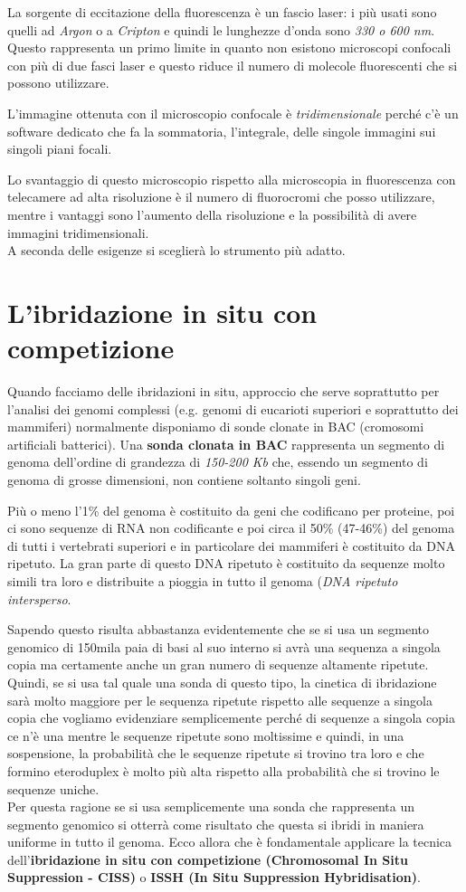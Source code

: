 \documentclass[11pt]{book}
\begin{document}
La sorgente di eccitazione della fluorescenza è un fascio laser: i più usati sono quelli ad \emph{Argon} o a \emph{Cripton} e quindi le lunghezze d’onda sono \emph{330 o 600 nm}. Questo rappresenta un primo limite in quanto non esistono microscopi confocali con più di due fasci laser e questo riduce il numero di molecole fluorescenti che si possono utilizzare. 

L’immagine ottenuta con il microscopio confocale è \emph{tridimensionale} perché c’è un software dedicato che fa la sommatoria, l’integrale, delle singole immagini sui singoli piani focali.

Lo svantaggio di questo microscopio rispetto alla microscopia in fluorescenza con telecamere ad alta risoluzione è il numero di fluorocromi che posso utilizzare, mentre i vantaggi sono l’aumento della risoluzione e la possibilità di avere immagini tridimensionali.\\
A seconda delle esigenze si sceglierà lo strumento più adatto.

\section{L'ibridazione in situ con competizione}
Quando facciamo delle ibridazioni in situ, approccio che serve soprattutto per l’analisi dei genomi complessi (e.g. genomi di eucarioti superiori e soprattutto dei mammiferi) normalmente disponiamo di sonde clonate in BAC (cromosomi artificiali batterici). 
Una \textbf{sonda clonata in BAC} rappresenta un segmento di genoma dell’ordine di grandezza di \emph{150-200 Kb} che, essendo un segmento di genoma di grosse dimensioni, non contiene soltanto singoli geni.

Più o meno l’1\% del genoma è costituito da geni che codificano per proteine, poi ci sono sequenze di RNA non codificante e poi circa il 50\% (47-46\%) del genoma di tutti i vertebrati superiori e in particolare dei mammiferi è costituito da DNA ripetuto. La gran parte di questo DNA ripetuto è costituito da sequenze molto simili tra loro e distribuite a pioggia in tutto il genoma (\emph{DNA ripetuto intersperso}.

Sapendo questo risulta abbastanza evidentemente che se si usa un segmento genomico di 150mila paia di basi al suo interno si avrà una sequenza a singola copia ma certamente anche un gran numero di sequenze altamente ripetute. Quindi, se si usa tal quale una sonda di questo tipo, la cinetica di ibridazione sarà molto maggiore per le sequenza ripetute rispetto alle sequenze a singola copia che vogliamo evidenziare semplicemente perché di sequenze a singola copia ce n’è una mentre le sequenze ripetute sono moltissime e quindi, in una sospensione, la probabilità che le sequenze ripetute si trovino tra loro e che formino eteroduplex è molto più alta rispetto alla probabilità che si trovino le sequenze uniche.\\
Per questa ragione se si usa semplicemente una sonda che rappresenta un segmento genomico si otterrà come risultato che questa si ibridi in maniera uniforme in tutto il genoma. Ecco allora che è fondamentale applicare la tecnica dell'\textbf{ibridazione in situ con competizione (Chromosomal In Situ Suppression - CISS)} o \textbf{ISSH (In Situ Suppression Hybridisation)}.
\end{document}
